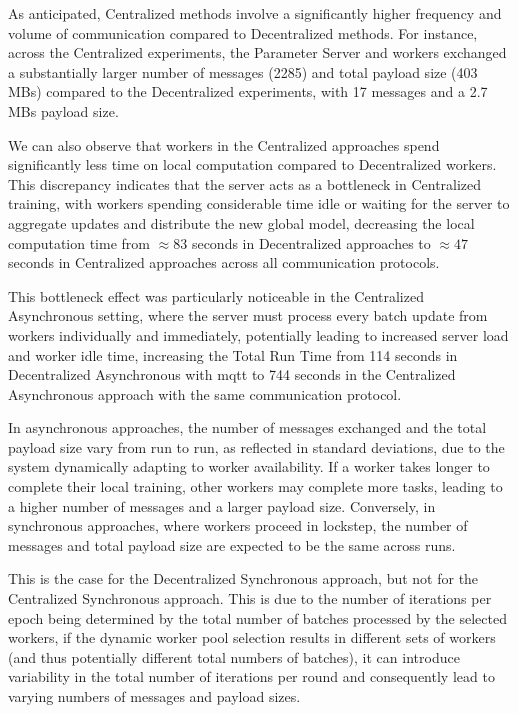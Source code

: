 As anticipated, Centralized methods involve a significantly higher frequency and volume of communication compared to Decentralized methods. For instance, across the Centralized experiments, the Parameter Server and workers exchanged a substantially larger number of messages (2285) and total payload size (403 MBs) compared to the Decentralized experiments, with 17 messages and a 2.7 MBs payload size.

We can also observe that workers in the Centralized approaches spend significantly less time on local computation compared to Decentralized workers. This discrepancy indicates that the server acts as a bottleneck in Centralized training, with workers spending considerable time idle or waiting for the server to aggregate updates and distribute the new global model, decreasing the local computation time from $\approx 83$ seconds in Decentralized approaches to $\approx 47$ seconds in Centralized approaches across all communication protocols.

This bottleneck effect was particularly noticeable in the Centralized Asynchronous setting, where the server must process every batch update from workers individually and immediately, potentially leading to increased server load and worker idle time, increasing the Total Run Time from 114 seconds in Decentralized Asynchronous with \ac{mqtt} to 744 seconds in the Centralized Asynchronous approach with the same communication protocol.

In asynchronous approaches, the number of messages exchanged and the total payload size vary from run to run, as reflected in standard deviations, due to the system dynamically adapting to worker availability. If a worker takes longer to complete their local training, other workers may complete more tasks, leading to a higher number of messages and a larger payload size. Conversely, in synchronous approaches, where workers proceed in lockstep, the number of messages and total payload size are expected to be the same across runs. 

This is the case for the Decentralized Synchronous approach, but not for the Centralized Synchronous approach. This is due to the number of iterations per epoch being determined by the total number of batches processed by the selected workers, if the dynamic worker pool selection results in different sets of workers (and thus potentially different total numbers of batches), it can introduce variability in the total number of iterations per round and consequently lead to varying numbers of messages and payload sizes.

